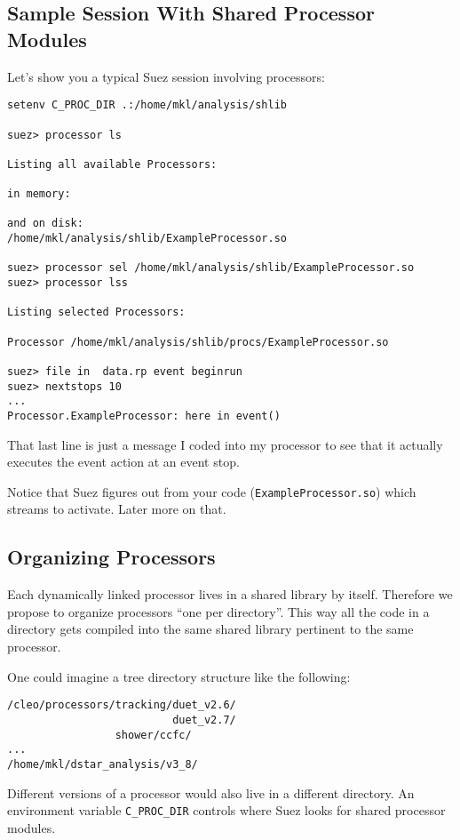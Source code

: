 \documentclass[12pt]{article}
\begin{document}
\subsection{Sample Session With Shared Processor Modules}
\label{sec:SampleSharedProcessorSession}

Let's show you a typical Suez session involving processors:
%
\begin{verbatim}
setenv C_PROC_DIR .:/home/mkl/analysis/shlib

suez> processor ls

Listing all available Processors:

in memory:

and on disk:
/home/mkl/analysis/shlib/ExampleProcessor.so

suez> processor sel /home/mkl/analysis/shlib/ExampleProcessor.so
suez> processor lss

Listing selected Processors:

Processor /home/mkl/analysis/shlib/procs/ExampleProcessor.so

suez> file in  data.rp event beginrun
suez> nextstops 10
...
Processor.ExampleProcessor: here in event()
\end{verbatim}
%
That last line is just a message I coded into my processor to see that
it actually executes the event action at an event stop.

Notice that Suez figures out from your code (\verb=ExampleProcessor.so=)
which streams to activate. Later more on that.

\subsection{Organizing Processors }
\label{sec:OrganizingProcessors}

Each dynamically linked processor lives in a shared library by
itself. Therefore we propose to organize processors ``one per
directory''. This way all the code in a directory gets compiled into the
same shared library pertinent to the same processor.

One could imagine a tree directory structure like the following:
%
\begin{verbatim}
/cleo/processors/tracking/duet_v2.6/
                          duet_v2.7/
                 shower/ccfc/
...
/home/mkl/dstar_analysis/v3_8/
\end{verbatim}
%
Different versions of a processor would also live in a different directory.
An environment variable \texttt{C\_PROC\_DIR} controls where Suez looks 
for shared processor modules.
\end{document}
